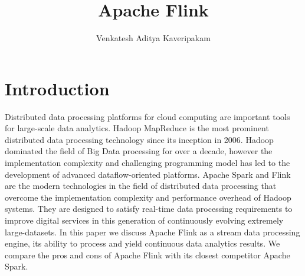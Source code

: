 
\title{Apache Flink}


\author{Venkatesh Aditya Kaveripakam}

\renewcommand{\shortauthors}{Venkatesh}


\maketitle

\section{Introduction}
Distributed data processing platforms for cloud computing are important tools
for large-scale data analytics. Hadoop MapReduce is the most prominent
distributed data processing technology since its inception in 2006. Hadoop
dominated the field of Big Data processing for over a decade, however the
implementation complexity and challenging programming model has led to the
development of advanced dataflow-oriented platforms. Apache Spark and Flink are
the modern technologies in the field of distributed data processing that
overcome the implementation complexity and performance overhead of Hadoop
systems. They are designed to satisfy real-time data processing requirements to
improve digital services in this generation of continuously evolving extremely
large-datasets. In this paper we discuss Apache Flink as a stream data
processing engine, its ability to process and yield continuous data analytics
results. We compare the pros and cons of Apache Flink with its closest
competitor Apache Spark.
